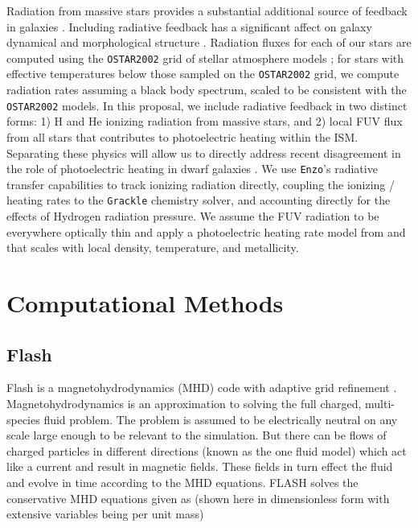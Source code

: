 \documentclass[11pt]{article}
\newcommand{\eg}{e.g.,}
\begin{document}
Radiation from massive stars provides a substantial additional source of feedback in galaxies \citep[\eg][]{Agertz2013}. Including radiative feedback has a significant affect on galaxy dynamical and morphological structure \citep[\eg][]{WiseAbel2012, Kim2013a, Kim2013b, Roskar2014, Rosdahl2015}. Radiation fluxes for each of our stars are computed using the \texttt{OSTAR2002} grid of stellar atmosphere models \citep{Lanz2003}; for stars with effective temperatures below those sampled on the \texttt{OSTAR2002} grid, we compute radiation rates assuming a black body spectrum, scaled to be consistent with the \texttt{OSTAR2002} models. In this proposal, we include radiative feedback in two distinct forms: 1) H and He ionizing radiation from massive stars, and 2) local FUV flux from all stars that contributes to photoelectric heating within the ISM. Separating these physics will allow us to directly address recent disagreement in the role of photoelectric heating in dwarf galaxies \citep{Hu2016, Forbes2016}. We use \texttt{Enzo}'s radiative transfer capabilities \citep{Wise2012a,WiseAbel2012,Wise2014} to track ionizing radiation directly, coupling the ionizing / heating rates to the \texttt{Grackle} chemistry solver, and accounting directly for the effects of Hydrogen radiation pressure. We assume the FUV radiation to be everywhere optically thin and apply a photoelectric heating rate model from \cite{BakesTielens1994} and \cite{Wolfire2003} that scales with local density, temperature, and metallicity.

\section{Computational Methods}

\subsection{Flash}

Flash is a magnetohydrodynamics (MHD) code with adaptive grid refinement \citep{FLASH}. Magnetohydrodynamics is an approximation to solving the full charged, multi-species fluid problem. The problem is assumed to be electrically neutral on any scale large enough to be relevant to the simulation. But there can be flows of charged particles in different directions (known as the one fluid model) which act like a current and result in magnetic fields. These fields in turn effect the fluid and evolve in time according to the MHD equations. FLASH solves the conservative MHD equations given as (shown here in dimensionless form with extensive variables being per unit mass)
\end{document}
